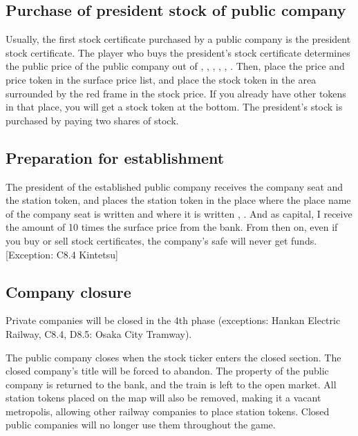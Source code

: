 \documentclass{article}
\begin{document}
\begin{CJK}{UTF8}{min}
\subsection{Purchase of president stock of public company}
Usually, the first stock certificate purchased by a public company is
the president stock certificate. The player who buys the president's
stock certificate determines the public price of the public company
out of , , , , , . Then,
place the price and price token in the surface price list, and place
the stock token in the area surrounded by the red frame in the stock
price. If you already have other tokens in that place, you will get a
stock token at the bottom. The president's stock is purchased by
paying two shares of stock.

\subsection{Preparation for establishment}
The president of the established public company receives the company
seat and the station token, and places the station token in the place
where the place name of the company seat is written and where it is
written , . And as capital, I receive the amount of 10
times the surface price from the bank. From then on, even if you buy
or sell stock certificates, the company's safe will never get
funds. [Exception: C8.4 Kintetsu]

\subsection{Company closure}
Private companies will be closed in the 4th phase (exceptions: Hankan
Electric Railway, C8.4, D8.5: Osaka City Tramway).

The public company closes when the stock ticker enters the closed
section. The closed company's title will be forced to abandon. The
property of the public company is returned to the bank, and the train
is left to the open market. All station tokens placed on the map will
also be removed, making it a vacant metropolis, allowing other railway
companies to place station tokens. Closed public companies will no
longer use them throughout the game.





\end{CJK}
\end{document}

